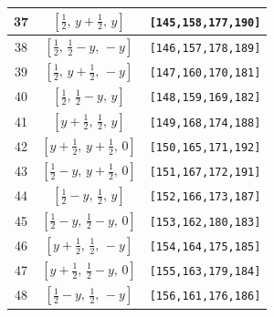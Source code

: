 \documentclass[fleqn,8pt]{jsarticle}
\begin{document}
\begin{longtable}{ccc}
37 & $\left[ \frac{1}{2},\, y + \frac{1}{2},\, y \right]$ & {\tt [145,158,177,190]} \\ \hline
38 & $\left[ \frac{1}{2},\, \frac{1}{2} - y,\, - y \right]$ & {\tt [146,157,178,189]} \\ \hline
39 & $\left[ \frac{1}{2},\, y + \frac{1}{2},\, - y \right]$ & {\tt [147,160,170,181]} \\ \hline
40 & $\left[ \frac{1}{2},\, \frac{1}{2} - y,\, y \right]$ & {\tt [148,159,169,182]} \\ \hline
41 & $\left[ y + \frac{1}{2},\, \frac{1}{2},\, y \right]$ & {\tt [149,168,174,188]} \\ \hline
42 & $\left[ y + \frac{1}{2},\, y + \frac{1}{2},\, 0 \right]$ & {\tt [150,165,171,192]} \\ \hline
43 & $\left[ \frac{1}{2} - y,\, y + \frac{1}{2},\, 0 \right]$ & {\tt [151,167,172,191]} \\ \hline
44 & $\left[ \frac{1}{2} - y,\, \frac{1}{2},\, y \right]$ & {\tt [152,166,173,187]} \\ \hline
45 & $\left[ \frac{1}{2} - y,\, \frac{1}{2} - y,\, 0 \right]$ & {\tt [153,162,180,183]} \\ \hline
46 & $\left[ y + \frac{1}{2},\, \frac{1}{2},\, - y \right]$ & {\tt [154,164,175,185]} \\ \hline
47 & $\left[ y + \frac{1}{2},\, \frac{1}{2} - y,\, 0 \right]$ & {\tt [155,163,179,184]} \\ \hline
48 & $\left[ \frac{1}{2} - y,\, \frac{1}{2},\, - y \right]$ & {\tt [156,161,176,186]} \\
\end{longtable}
\renewcommand{\arraystretch}{1.2}
\end{document}
